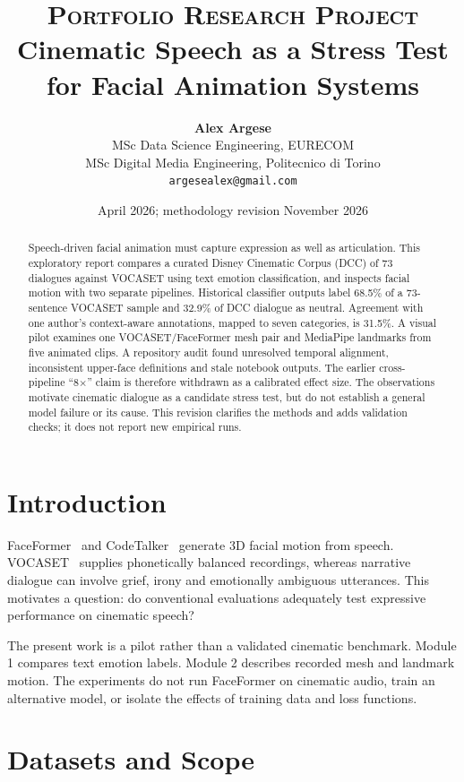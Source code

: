 \documentclass[10pt]{article}
\title{
  \vspace{-0.5cm}
  {\large \textsc{Portfolio Research Project}} \\[0.4em]
  {\LARGE \textbf{Cinematic Speech as a Stress Test\\
  for Facial Animation Systems}} \\[0.4em]
}
\author{
  \textbf{Alex Argese} \\
  \small MSc Data Science Engineering, EURECOM \\
  \small MSc Digital Media Engineering, Politecnico di Torino \\
  \small \texttt{argesealex@gmail.com}
}
\date{\small April 2026; methodology revision November 2026}
\begin{document}
\maketitle
\thispagestyle{plain}


\begin{abstract}
Speech-driven facial animation must capture expression as well as articulation.
This exploratory report compares a curated Disney Cinematic Corpus (DCC) of 73
dialogues against VOCASET using text emotion classification, and inspects facial
motion with two separate pipelines. Historical classifier outputs label 68.5\% of
a 73-sentence VOCASET sample and 32.9\% of DCC dialogue as neutral. Agreement with
one author's context-aware annotations, mapped to seven categories, is 31.5\%.
A visual pilot examines one VOCASET/FaceFormer mesh pair and MediaPipe landmarks
from five animated clips. A repository audit found unresolved temporal alignment,
inconsistent upper-face definitions and stale notebook outputs. The earlier
cross-pipeline ``8$\times$'' claim is therefore withdrawn as a calibrated effect
size. The observations motivate cinematic dialogue as a candidate stress test,
but do not establish a general model failure or its cause. This revision clarifies
the methods and adds validation checks; it does not report new empirical runs.
\end{abstract}

\section{Introduction}
FaceFormer~\cite{faceformer} and CodeTalker~\cite{codetalker} generate 3D facial
motion from speech. VOCASET~\cite{vocaset} supplies phonetically balanced recordings,
whereas narrative dialogue can involve grief, irony and emotionally ambiguous
utterances. This motivates a question: do conventional evaluations adequately test
expressive performance on cinematic speech?

The present work is a pilot rather than a validated cinematic benchmark. Module 1
compares text emotion labels. Module 2 describes recorded mesh and landmark motion.
The experiments do not run FaceFormer on cinematic audio, train an alternative
model, or isolate the effects of training data and loss functions.

\section{Datasets and Scope}
\end{document}
